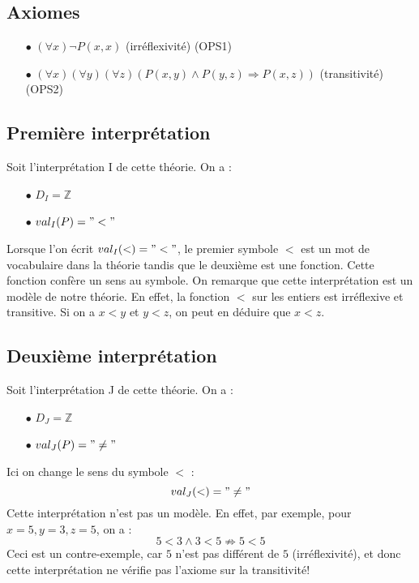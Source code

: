 \subsection*{Axiomes}
\begin{itemize}
\item[$\bullet$] $ (\forall x) \neg P(x,x) $  (irréflexivité) (OPS1)
\item[$\bullet$] $ (\forall x) (\forall y) (\forall z) (P(x,y) \wedge P(y,z) \Rightarrow P(x,z))$ (transitivité) (OPS2)
\end{itemize}
\subsection*{Première interprétation}
Soit l'interprétation I de cette théorie. On a :
\begin{itemize}
\item[$\bullet$] $D_I = \mathbb{Z} $
\item[$\bullet$] $val_I (P) = "<"$
\end{itemize}
Lorsque l'on écrit $val_I(<) = "<"$, le premier symbole $<$ est un mot de vocabulaire dans la théorie tandis que le deuxième est une fonction. Cette fonction confère un sens au symbole. 
On remarque que cette interprétation est un modèle de notre théorie. En effet, la fonction $<$ sur les entiers est irréflexive et transitive. Si on a $x < y$ et $y <z$, on peut en déduire que $x<z$.
\subsection*{Deuxième interprétation}
Soit l'interprétation J de cette théorie. On a : 
\begin{itemize}
\item[$\bullet$] $D_J = \mathbb{Z} $
\item[$\bullet$] $val_J (P) = "\ne"$
\end{itemize}
Ici on change le sens du symbole $<$ :
$$val_J(<) = "\ne"$$
Cette interprétation n'est pas un modèle. En effet, par exemple, pour $x=5, y=3, z=5$, on a :
$$5<3 \wedge 3<5 \nRightarrow 5<5$$
Ceci est un contre-exemple, car $5$ n'est pas différent de $5$ (irréflexivité), et donc cette interprétation ne vérifie pas l'axiome sur la transitivité!

